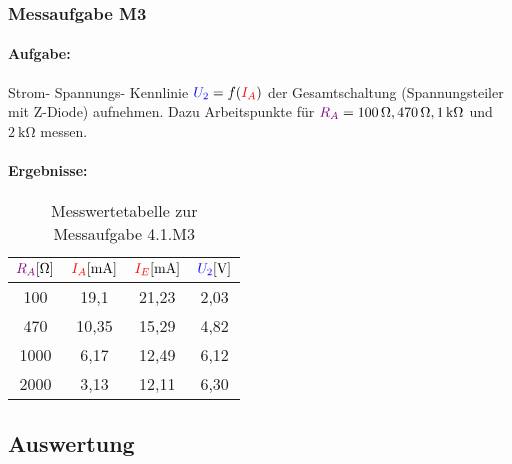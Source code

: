 \documentclass[a4paper,titlepage,parskip]{scrreprt}
\newcommand{\spannung}[1]{\textcolor{blue}{#1}}
\newcommand{\strom}[1]{\textcolor{red}{#1}}
\newcommand{\widerstand}[1]{\textcolor{violet}{#1}}
\begin{document}
            \subsubsection{Messaufgabe M3}
              \paragraph{Aufgabe:} Strom- Spannungs- Kennlinie $\spannung{U_2}= f(\strom{I_A})$ der Gesamtschaltung (Spannungsteiler mit Z-Diode) aufnehmen. Dazu Arbeitspunkte für $\widerstand{R_A} = \SI{100}{\ohm}, \SI{470}{\ohm}, \SI{1}{\kilo\ohm}$ und $\SI{2}{\kilo\ohm}$ messen.
			  \pagebreak              
              \paragraph{Ergebnisse:}
              \begin{center}
                  \begin{table}[!hbtp]
                      \caption{Messwertetabelle zur Messaufgabe 4.1.M3}
                      \label{tbl:messergebnisse4.1}
                      \renewcommand{\arraystretch}{1.3}
                      \begin{center}
                          \begin{tabular}{c|ccc}
                              $\widerstand{R_A} [\si{\ohm}]$&
                              $\strom{I_A} [\si{\milli\ampere}]$&
                              $\strom{I_E} [\si{\milli\ampere}]$&
                              $\spannung{U_2} [\si{\volt}]$\\ \hline

                              100 & 19,1 & 21,23 & 2,03\\
                              470 & 10,35 & 15,29 & 4,82\\
                              1000 & 6,17 & 12,49 & 6,12\\
                              2000 & 3,13 & 12,11 & 6,30\\
                          \end{tabular}
                      \end{center}
                  \end{table}
                  \end{center}

          \subsection{Auswertung}
\end{document}
